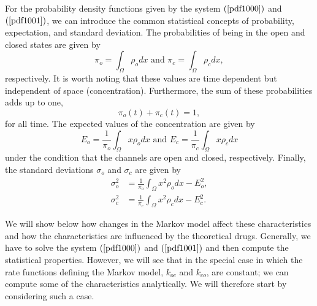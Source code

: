 \bigskip For the probability density functions given by the system $\left(
\ref{pdf1000}\right)$ and $\left(\ref{pdf1001}\right)  $, we can introduce the common statistical
concepts of probability, expectation, and standard deviation. The probabilities of
being in the open and closed states are given by%
\begin{equation}
\pi_{o}=\int_{\Omega}\rho_{o}dx \text{ and }\pi_{c}=\int_{\Omega}\rho_{c}dx,
\label{probability}%
\end{equation}
respectively. It is worth noting that these values are time dependent but
independent of space (concentration). Furthermore, the sum of these
probabilities adds up to one,%
\[
\pi_{o}\left(  t\right)  +\pi_{c}\left(  t\right)  =1,
\]
for all time. The expected values of the concentration are given by%
\begin{equation}
E_{o}=\frac{1}{\pi_{o}}\int_{\Omega}x\rho_{o}dx \text{ and }E_{c}=\frac{1}%
{\pi_{c}}\int_{\Omega}x\rho_{c}dx \label{expectation}%
\end{equation}
under the condition that the channels are open and closed, respectively. Finally, the standard deviations $\sigma_{o}$ and $\sigma_{c}$ are given by%
\begin{align}
\sigma_{o}^{2}  &  =\frac{1}{\pi_{o}}\int_{\Omega}x^{2}\rho_{o}dx-E_{o}^{2},\label{stdvo}\\
\sigma_{c}^{2}  &  =\frac{1}{\pi_{c}}\int_{\Omega}x^{2}\rho_{c}dx-E_{c}^{2}. \label{stdvc}%
\end{align}

We will show below how changes in the Markov model affect these
characteristics and how the characteristics are influenced by the
theoretical drugs. Generally, we have to solve the system $\left(
\ref{pdf1000}\right)$ and $\left(\ref{pdf1001}\right)  $ and then compute the statistical
properties. However, we will see that in the special case in which the rate functions
defining the Markov model, $k_{oc}$ and $k_{co}$, are constant; we can compute some of
the characteristics analytically.  We will therefore start by considering such a case.



